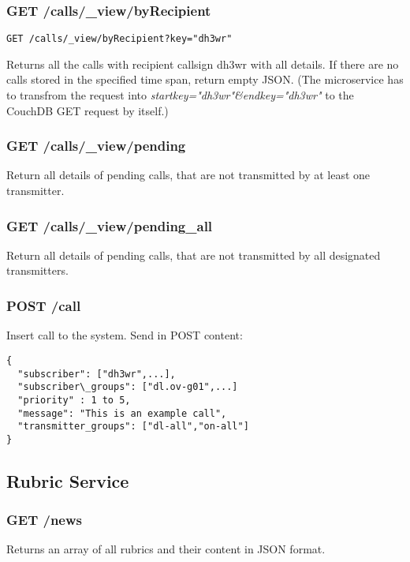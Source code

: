 \subsubsection{GET /calls/\_view/byRecipient}
\begin{verbatim}
GET /calls/_view/byRecipient?key="dh3wr"
\end{verbatim}

Returns all the calls with recipient callsign dh3wr with all details. If there are no calls stored in the specified time span, return empty JSON. (The microservice has to transfrom the request into \textit{startkey="dh3wr"\&endkey="dh3wr"} to the CouchDB GET request by itself.)


\subsubsection{GET /calls/\_view/pending}

Return all details of pending calls, that are not transmitted by at least one transmitter.

\subsubsection{GET /calls/\_view/pending\_all}
Return all details of pending calls, that are not transmitted by all designated transmitters.

\subsubsection{POST /call}
Insert call to the system. Send in POST content:
\begin{lstlisting}
{
  "subscriber": ["dh3wr",...],
  "subscriber\_groups": ["dl.ov-g01",...]
  "priority" : 1 to 5,
  "message": "This is an example call",
  "transmitter_groups": ["dl-all","on-all"]
}
\end{lstlisting}

\subsection{Rubric Service}

\subsubsection{GET /news}
Returns an array of all rubrics and their content in JSON format.

